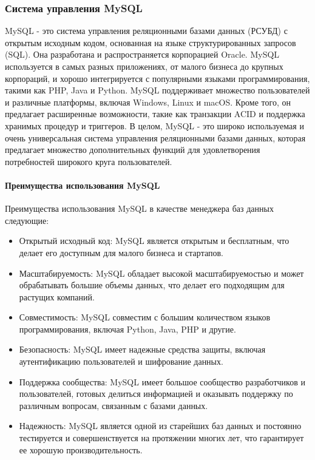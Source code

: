 \subsubsection{Система управления MySQL}

MySQL - это система управления реляционными базами данных (РСУБД) с открытым исходным кодом, основанная на языке структурированных запросов (SQL). Она разработана и распространяется корпорацией Oracle. MySQL используется в самых разных приложениях, от малого бизнеса до крупных корпораций, и хорошо интегрируется с популярными языками программирования, такими как PHP, Java и Python. MySQL поддерживает множество пользователей и различные платформы, включая Windows, Linux и macOS. Кроме того, он предлагает расширенные возможности, такие как транзакции ACID и поддержка хранимых процедур и триггеров. В целом, MySQL - это широко используемая и очень универсальная система управления реляционными базами данных, которая предлагает множество дополнительных функций для удовлетворения потребностей широкого круга пользователей\cite{MySQL}.

\paragraph{Преимущества использования MySQL}

Преимущества использования MySQL в качестве менеджера баз данных следующие:

\begin{itemize}
	\item Открытый исходный код: MySQL является открытым и бесплатным, что делает его доступным для малого бизнеса и стартапов.
	\item Масштабируемость: MySQL обладает высокой масштабируемостью и может обрабатывать большие объемы данных, что делает его подходящим для растущих компаний.
	\item Совместимость: MySQL совместим с большим количеством языков программирования, включая Python, Java, PHP и другие.
	\item Безопасность: MySQL имеет надежные средства защиты, включая аутентификацию пользователей и шифрование данных.
	\item Поддержка сообщества: MySQL имеет большое сообщество разработчиков и пользователей, готовых делиться информацией и оказывать поддержку по различным вопросам, связанным с базами данных.
	\item Надежность: MySQL является одной из старейших баз данных и постоянно тестируется и совершенствуется на протяжении многих лет, что гарантирует ее хорошую производительность.
\end{itemize}

